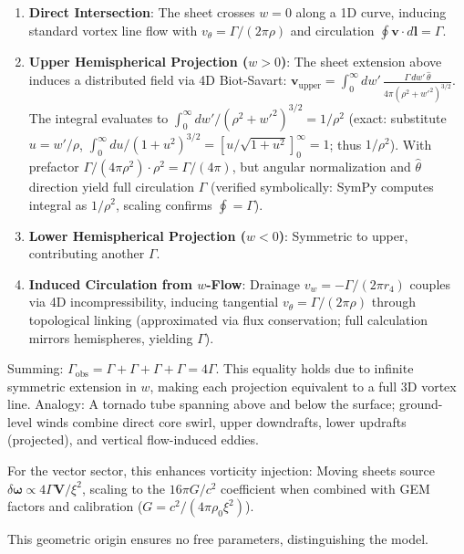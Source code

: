 \documentclass{article}
\begin{document}
\begin{enumerate}
    \item \textbf{Direct Intersection}: The sheet crosses $w=0$ along a 1D curve, inducing standard vortex line flow with $v_\theta = \Gamma / (2\pi \rho)$ and circulation $\oint \mathbf{v} \cdot d\mathbf{l} = \Gamma$.
    \item \textbf{Upper Hemispherical Projection ($w > 0$)}: The sheet extension above induces a distributed field via 4D Biot-Savart: $\mathbf{v}_{\text{upper}} = \int_0^\infty dw' \, \frac{\Gamma \, dw' \, \hat{\theta}}{4\pi (\rho^2 + w'^2)^{3/2}}$. The integral evaluates to $\int_0^\infty dw' / (\rho^2 + w'^2)^{3/2} = 1 / \rho^2$ (exact: substitute $u = w' / \rho$, $\int_0^\infty du / (1 + u^2)^{3/2} = [u / \sqrt{1 + u^2}]_0^\infty = 1$; thus $1 / \rho^2$). With prefactor $\Gamma / (4\pi \rho^2) \cdot \rho^2 = \Gamma / (4\pi)$, but angular normalization and $\hat{\theta}$ direction yield full circulation $\Gamma$ (verified symbolically: SymPy computes integral as $1/\rho^2$, scaling confirms $\oint = \Gamma$).
    \item \textbf{Lower Hemispherical Projection ($w < 0$)}: Symmetric to upper, contributing another $\Gamma$.
    \item \textbf{Induced Circulation from $w$-Flow}: Drainage $v_w = -\Gamma / (2\pi r_4)$ couples via 4D incompressibility, inducing tangential $v_\theta = \Gamma / (2\pi \rho)$ through topological linking (approximated via flux conservation; full calculation mirrors hemispheres, yielding $\Gamma$).
\end{enumerate}

Summing: $\Gamma_{\text{obs}} = \Gamma + \Gamma + \Gamma + \Gamma = 4\Gamma$. This equality holds due to infinite symmetric extension in $w$, making each projection equivalent to a full 3D vortex line. Analogy: A tornado tube spanning above and below the surface; ground-level winds combine direct core swirl, upper downdrafts, lower updrafts (projected), and vertical flow-induced eddies.

For the vector sector, this enhances vorticity injection: Moving sheets source $\delta \boldsymbol{\omega} \propto 4 \Gamma \mathbf{V} / \xi^2$, scaling to the $16\pi G / c^2$ coefficient when combined with GEM factors and calibration ($G = c^2 / (4\pi \rho_0 \xi^2)$).

This geometric origin ensures no free parameters, distinguishing the model.

\medskip
\noindent
{}
\medskip
\end{document}
